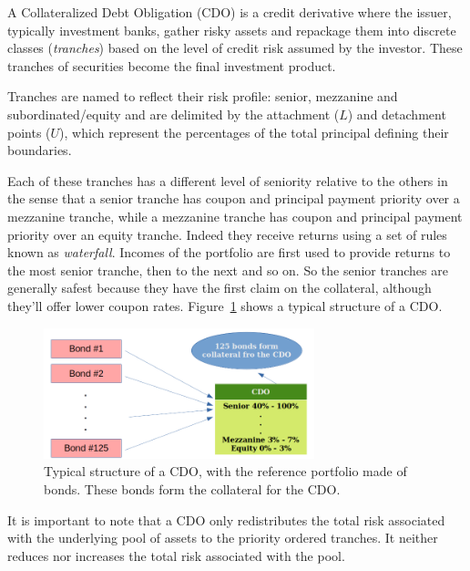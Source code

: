 A Collateralized Debt Obligation (CDO) is a credit derivative where the issuer, typically investment banks, gather risky assets and repackage them into discrete classes (\emph{tranches}) based on the level of credit risk assumed by the investor. These tranches of securities become the final investment product.

Tranches are named to reflect their risk profile: senior, mezzanine and subordinated/equity and are delimited by the attachment ($L$) and detachment points ($U$), which represent the percentages of the total principal defining their boundaries. 

Each of these tranches has a different level of seniority relative to the others in the sense that a senior tranche has coupon
and principal payment priority over a mezzanine tranche, while a mezzanine tranche has
coupon and principal payment priority over an equity tranche. 
Indeed they receive returns using a set of rules known as \emph{waterfall}. Incomes of the portfolio are first used to provide returns to the most senior tranche, then to the next and so on.
So the senior tranches are generally safest because they have the first claim on the collateral, although they'll offer lower coupon rates.
Figure~\ref{fig:cdo_structure} shows a typical structure of a CDO.

\begin{figure}
	\centering
	\includegraphics[width=0.7\textwidth]{figures/cdo_structure}
	\caption{Typical structure of a CDO, with the reference portfolio made of bonds. These bonds form the collateral for the CDO.}
	\label{fig:cdo_structure}
\end{figure}

It is important to note
that a CDO only redistributes the total risk associated with the underlying pool of assets
to the priority ordered tranches. It neither reduces nor increases the total risk associated
with the pool.

